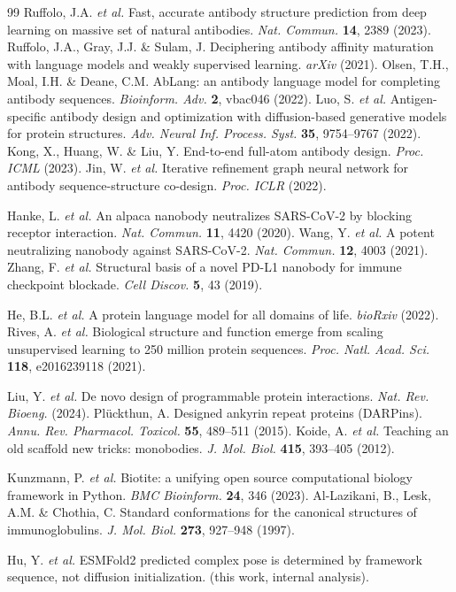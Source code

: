 \documentclass[11pt,a4paper]{article}
\begin{document}
\begin{thebibliography}{99}
 Ruffolo, J.A. \textit{et al.} Fast, accurate antibody structure prediction from deep learning on massive set of natural antibodies. \textit{Nat. Commun.} \textbf{14}, 2389 (2023).
 Ruffolo, J.A., Gray, J.J. \& Sulam, J. Deciphering antibody affinity maturation with language models and weakly supervised learning. \textit{arXiv} (2021).
 Olsen, T.H., Moal, I.H. \& Deane, C.M. AbLang: an antibody language model for completing antibody sequences. \textit{Bioinform. Adv.} \textbf{2}, vbac046 (2022).
 Luo, S. \textit{et al.} Antigen-specific antibody design and optimization with diffusion-based generative models for protein structures. \textit{Adv. Neural Inf. Process. Syst.} \textbf{35}, 9754--9767 (2022).
 Kong, X., Huang, W. \& Liu, Y. End-to-end full-atom antibody design. \textit{Proc. ICML} (2023).
 Jin, W. \textit{et al.} Iterative refinement graph neural network for antibody sequence-structure co-design. \textit{Proc. ICLR} (2022).

 Hanke, L. \textit{et al.} An alpaca nanobody neutralizes SARS-CoV-2 by blocking receptor interaction. \textit{Nat. Commun.} \textbf{11}, 4420 (2020).
 Wang, Y. \textit{et al.} A potent neutralizing nanobody against SARS-CoV-2. \textit{Nat. Commun.} \textbf{12}, 4003 (2021).
 Zhang, F. \textit{et al.} Structural basis of a novel PD-L1 nanobody for immune checkpoint blockade. \textit{Cell Discov.} \textbf{5}, 43 (2019).

 He, B.L. \textit{et al.} A protein language model for all domains of life. \textit{bioRxiv} (2022).
 Rives, A. \textit{et al.} Biological structure and function emerge from scaling unsupervised learning to 250 million protein sequences. \textit{Proc. Natl. Acad. Sci.} \textbf{118}, e2016239118 (2021).

 Liu, Y. \textit{et al.} De novo design of programmable protein interactions. \textit{Nat. Rev. Bioeng.} (2024).
 Pl{\"u}ckthun, A. Designed ankyrin repeat proteins (DARPins). \textit{Annu. Rev. Pharmacol. Toxicol.} \textbf{55}, 489--511 (2015).
 Koide, A. \textit{et al.} Teaching an old scaffold new tricks: monobodies. \textit{J. Mol. Biol.} \textbf{415}, 393--405 (2012).

 Kunzmann, P. \textit{et al.} Biotite: a unifying open source computational biology framework in Python. \textit{BMC Bioinform.} \textbf{24}, 346 (2023).
 Al-Lazikani, B., Lesk, A.M. \& Chothia, C. Standard conformations for the canonical structures of immunoglobulins. \textit{J. Mol. Biol.} \textbf{273}, 927--948 (1997).

 Hu, Y. \textit{et al.} ESMFold2 predicted complex pose is determined by framework sequence, not diffusion initialization. (this work, internal analysis).

\end{thebibliography}
\end{document}
